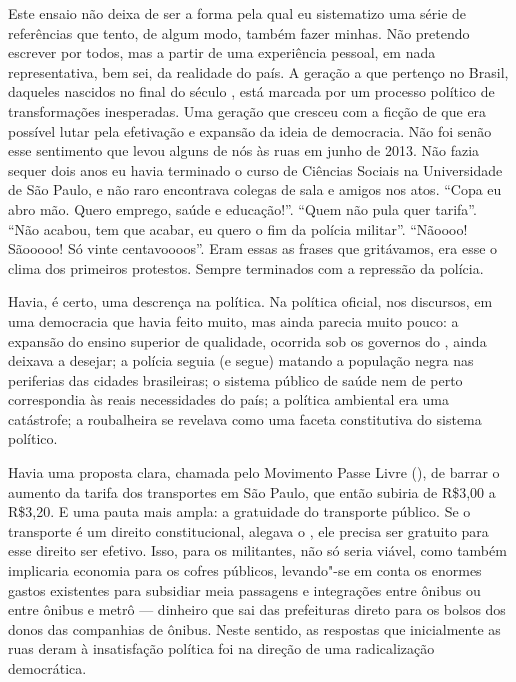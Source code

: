 Este ensaio não deixa de ser a forma pela qual eu
sistematizo uma série de referências que tento, de algum modo, também
fazer minhas. Não pretendo escrever por todos, mas a partir de uma experiência pessoal, em nada representativa, bem sei, da realidade do país. A geração a que pertenço no Brasil, daqueles nascidos no
final do século , está marcada por um processo político de
transformações inesperadas. Uma geração que cresceu com a ficção de que
era possível lutar pela efetivação e expansão da ideia de democracia.
Não foi senão esse sentimento que levou alguns de nós às ruas em junho
de 2013. Não fazia sequer dois anos eu havia terminado o curso de Ciências
Sociais na Universidade de São Paulo, e não raro encontrava colegas de
sala e amigos nos atos. ``Copa eu abro mão. Quero emprego, saúde e
educação!''. ``Quem não pula quer tarifa''. ``Não acabou, tem que
acabar, eu quero o fim da polícia militar''. ``Nãoooo! Sãooooo! Só vinte
centavoooos''. Eram essas as frases que gritávamos, era esse o clima dos
primeiros protestos. Sempre terminados com a repressão da polícia.

Havia, é certo, uma descrença na política. Na política oficial, nos
discursos, em uma democracia que havia feito muito, mas ainda parecia
muito pouco: a expansão do ensino superior de qualidade, ocorrida sob os governos do , ainda deixava a desejar; a polícia
seguia (e segue) matando a população negra nas periferias das cidades
brasileiras; o sistema público de saúde nem de perto correspondia às
reais necessidades do país; a política ambiental era uma catástrofe; a
roubalheira se revelava como uma faceta constitutiva do sistema
político.

Havia uma proposta clara, chamada pelo Movimento Passe Livre
(), de barrar o aumento da tarifa dos transportes em São Paulo, que então subiria
de R\$3,00 a R\$3,20. E uma pauta mais ampla: a gratuidade do transporte
público. Se o transporte é um direito constitucional, alegava o , ele
precisa ser gratuito para esse direito ser efetivo. Isso, para os
militantes, não só seria viável, como também implicaria economia para os cofres
públicos, levando"-se em conta os enormes gastos existentes para
subsidiar meia passagens e integrações entre ônibus ou entre ônibus e
metrô --- dinheiro que sai das prefeituras direto para os bolsos dos
donos das companhias de ônibus. Neste sentido, as respostas que
inicialmente as ruas deram à insatisfação política foi na direção de uma
radicalização democrática.

